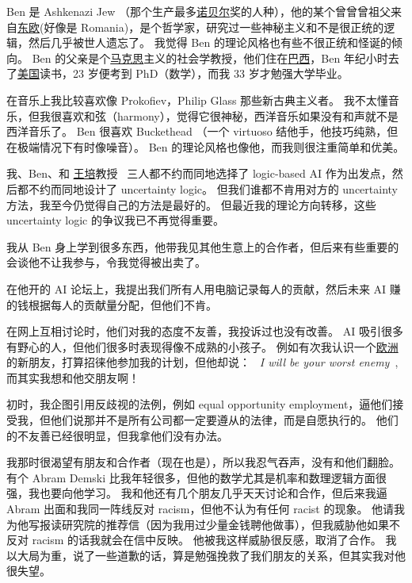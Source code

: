 \documentclass[12pt]{report}
\newcommand{\cc}[2]{#1}
\newcommand{\cc}[2]{#2}
\newcommand{\speechEn}[1]{\textrm{\textit{\ #1\ }}}
\begin{document}
{{}

\cc{
Ben 是 Ashkenazi Jew （那个生产最多\uline{诺贝尔}奖的人种），他的某个曾曾曾祖父来自\uline{东欧}(好像是 Romania)，是个哲学家，研究过一些神秘主义和不是很正统的逻辑，然后几乎被世人遗忘了。 我觉得 Ben 的理论风格也有些不很正统和怪诞的倾向。  Ben 的父亲是个\uline{马克思}主义的社会学教授，他们住在\uline{巴西}，Ben 年纪小时去了\uline{美国}读书，23 岁便考到 PhD（数学），而我 33 岁才勉强大学毕业。
}{
	
}

\cc{
在音乐上我比较喜欢像 Prokofiev，Philip Glass 那些新古典主义者。 我不太懂音乐，但我很喜欢和弦（harmony），觉得它很神秘，西洋音乐如果没有和声就不是西洋音乐了。 Ben 很喜欢 Buckethead （一个 virtuoso 结他手，他技巧纯熟，但在极端情况下有时像噪音）。 Ben 的理论风格也像他，而我则很注重简单和优美。
}{
	
}

\cc{
我、Ben、和 \uline{王培}教授 ~三人都不约而同地选择了 logic-based AI 作为出发点，然后都不约而同地设计了 uncertainty logic。  但我们谁都不肯用对方的 uncertainty 方法，我至今仍觉得自己的方法是最好的。 但最近我的理论方向转移，这些 uncertainty logic 的争议我已不再觉得重要。
}{
	
}

\cc{
我从 Ben 身上学到很多东西，他带我见其他生意上的合作者，但后来有些重要的会谈他不让我参与，令我觉得被出卖了。
}{
	
}

\cc{
在他开的 AI 论坛上，我提出我们所有人用电脑记录每人的贡献，然后未来 AI 赚的钱根据每人的贡献量分配，但他们不肯。
}{
	
}

\cc{
在网上互相讨论时，他们对我的态度不友善，我投诉过也没有改善。  AI 吸引很多有野心的人，但他们很多时表现得像不成熟的小孩子。  例如有次我认识一个\uline{欧洲}的新朋友，打算招徕他参加我的计划，但他却说： \speechEn{I will be your worst enemy}, 而其实我想和他交朋友啊！
}{
	
}

\cc{
初时，我企图引用反歧视的法例，例如 equal opportunity employment，逼他们接受我，但他们说那并不是所有公司都一定要遵从的法律，而是自愿执行的。 他们的不友善已经很明显，但我拿他们没有办法。
}{
	
}

\cc{
我那时很渴望有朋友和合作者（现在也是），所以我忍气吞声，没有和他们翻脸。 有个 Abram Demski 比我年轻很多，但他的数学尤其是机率和数理逻辑方面很强，我也要向他学习。 我和他还有几个朋友几乎天天讨论和合作，但后来我逼 Abram 出面和我同一阵线反对 racism，但他不认为有任何 racist 的现象。 他请我为他写报读研究院的推荐信（因为我用过少量金钱聘他做事），但我威胁他如果不反对 racism 的话我就会在信中反映。 他被我这样威胁很反感，取消了合作。 我以大局为重，说了一些道歉的话，算是勉强挽救了我们朋友的关系，但其实我对他很失望。
}{
	
}}
\end{document}
